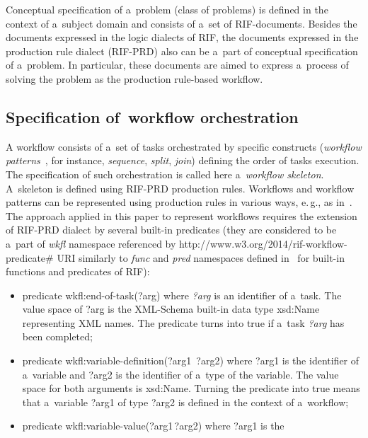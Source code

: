 \begin{multicols}{2}
  Conceptual specification of a~problem (class of problems) is defined in the context
of a~subject domain and consists of a~set of
  RIF-documents. Besides the documents expressed in the logic dialects of RIF, the
documents expressed in the production rule dialect (RIF-PRD) also can be a~part of
conceptual specification of a~problem. In particular, these documents are aimed to
express a~process of solving the problem as the production rule-based workflow.

\vspace*{-4pt}

\subsection{Specification of~workflow orchestration}

  A workflow consists of a~set of tasks orchestrated by specific constructs
(\textit{workflow patterns}~\cite{9-kal}, for instance, \textit{sequence}, \textit{split},
\textit{join}) defining the order of tasks execution. The specification of such
orchestration is called here a~\textit{workflow skeleton}. A~skeleton is defined using
RIF-PRD production rules. Workflows and workflow patterns can be represented
using production rules in various ways, e.\,g., as in~\cite{9-kal, 17-kal}. The
approach applied in this paper to represent workflows requires the extension of
  RIF-PRD dialect by several built-in predicates (they are considered to be a~part of
\textit{wkfl} namespace referenced by
  {\sf http://www.w3.org/2014/rif-workflow-predicate\#} URI similarly to
\textit{func} and \textit{pred} namespaces defined in~\cite{21-kal} for built-in
functions and predicates of RIF):
  \begin{itemize}
\item predicate {\sf wkfl:end-of-task(?arg)} where \textit{\sf ?arg} is an identifier of a~task. The value space of
{\sf ?arg} is the XML-Schema built-in data type
{\sf xsd:Name} representing XML names. The predicate turns into true if a~task
\textit{?arg} has been completed;
\item predicate {\sf wkfl:variable-definition(?arg1\, ?arg2)} where {\sf ?arg1}
is the identifier of a~variable and {\sf ?arg2} is the identifier of a~type of the
variable.
The value space for both arguments is {\sf xsd:Name}. Turning the predicate into
true means that a~variable {\sf ?arg1} of type {\sf ?arg2} is defined in the
context of a~workflow;
\item predicate {\sf wkfl:variable-value(?arg1\,?arg2)} where {\sf ?arg1} is the

\end{itemize}
\end{multicols}
